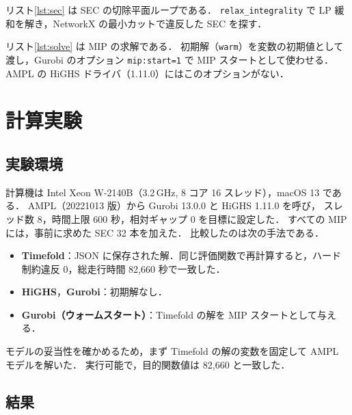 \documentclass[11pt,a4paper]{ltjsarticle}
\begin{document}


リスト\ref{lst:sec} は SEC の切除平面ループである．
\texttt{relax\_integrality} で LP 緩和を解き，NetworkX の最小カットで違反した SEC を探す．



リスト\ref{lst:solve} は MIP の求解である．
初期解（\texttt{warm}）を変数の初期値として渡し，Gurobi のオプション
\texttt{mip:start=1} で MIP スタートとして使わせる．
AMPL の HiGHS ドライバ（1.11.0）にはこのオプションがない．



\section{計算実験}

\subsection{実験環境}

計算機は Intel Xeon W-2140B（3.2\,GHz, 8 コア 16 スレッド），macOS 13 である．
AMPL（20221013 版）から Gurobi 13.0.0 と HiGHS 1.11.0 を呼び，
スレッド数 8，時間上限 600 秒，相対ギャップ 0 を目標に設定した．
すべての MIP には，事前に求めた SEC 32 本を加えた．
比較したのは次の手法である．
\begin{itemize}
  \item \textbf{Timefold}：JSON に保存された解．同じ評価関数で再計算すると，ハード制約違反 0，総走行時間 82,660 秒で一致した．
  \item \textbf{HiGHS}，\textbf{Gurobi}：初期解なし．
  \item \textbf{Gurobi（ウォームスタート）}：Timefold の解を MIP スタートとして与える．
\end{itemize}

モデルの妥当性を確かめるため，まず Timefold の解の変数を固定して AMPL モデルを解いた．
実行可能で，目的関数値は 82,660 と一致した．

\subsection{結果}
\end{document}
